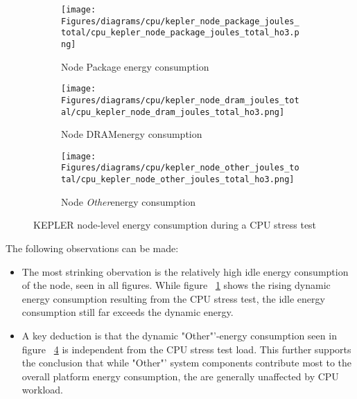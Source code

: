 \begin{figure}[H]
    \centering
    \begin{subfigure}{1\textwidth}
        \texttt{[image: Figures/diagrams/cpu/kepler\_node\_package\_joules\_total/cpu\_kepler\_node\_package\_joules\_total\_ho3.png]}
        \caption{Node Package energy consumption}
        \label{fig:cpu_kepler_node_package_joules_total}
    \end{subfigure}
    \begin{subfigure}{0.49\textwidth}
        \texttt{[image: Figures/diagrams/cpu/kepler\_node\_dram\_joules\_total/cpu\_kepler\_node\_dram\_joules\_total\_ho3.png]}
        \caption{Node DRAMenergy consumption}
        \label{fig:cpu_kepler_node_dram_joules_total}
    \end{subfigure}
    \begin{subfigure}{0.49\textwidth}
        \texttt{[image: Figures/diagrams/cpu/kepler\_node\_other\_joules\_total/cpu\_kepler\_node\_other\_joules\_total\_ho3.png]}
        \caption{Node \textit{Other}energy consumption}
        \label{fig:cpu_kepler_node_other_joules_total}
    \end{subfigure}
    \caption[Node-Level Energy Consumption]{KEPLER node-level energy consumption during a CPU stress test}
\end{figure}

The following observations can be made:
\begin{itemize}
\item The most strinking obervation is the relatively high idle energy consumption of the node, seen in all figures. While figure ~\ref{fig:cpu_kepler_node_package_joules_total} shows the rising dynamic energy consumption resulting from the CPU stress test, the idle energy consumption still far exceeds the dynamic energy.
\item A key deduction is that the dynamic "Other"'-energy consumption seen in figure ~\ref{fig:cpu_kepler_node_other_joules_total} is independent from the CPU stress test load. This further supports the conclusion that while "Other"' system components contribute most to the overall platform energy consumption, the are generally unaffected by CPU workload.
\end{itemize}

